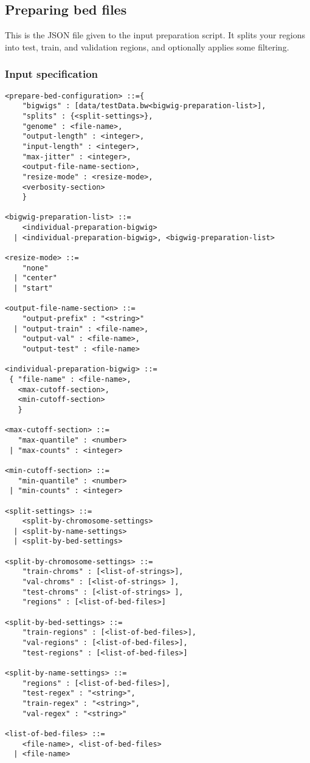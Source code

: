 \documentclass{article}
\begin{document}
\subsection{Preparing bed files}

This is the JSON file given to the input preparation script. It splits your regions into 
test, train, and validation regions, and optionally applies some filtering. 

\subsubsection{Input specification}

\begin{lstlisting}
<prepare-bed-configuration> ::={
    "bigwigs" : [data/testData.bw<bigwig-preparation-list>],
    "splits" : {<split-settings>},
    "genome" : <file-name>,
    "output-length" : <integer>,
    "input-length" : <integer>,
    "max-jitter" : <integer>,
    <output-file-name-section>,
    "resize-mode" : <resize-mode>,
    <verbosity-section>
    }

<bigwig-preparation-list> ::=
    <individual-preparation-bigwig> 
  | <individual-preparation-bigwig>, <bigwig-preparation-list>

<resize-mode> ::= 
    "none"
  | "center"
  | "start"

<output-file-name-section> ::=
    "output-prefix" : "<string>"
  | "output-train" : <file-name>,
    "output-val" : <file-name>,
    "output-test" : <file-name>

<individual-preparation-bigwig> ::=
 { "file-name" : <file-name>,
   <max-cutoff-section>,
   <min-cutoff-section> 
   }

<max-cutoff-section> ::=
   "max-quantile" : <number>
 | "max-counts" : <integer>

<min-cutoff-section> ::=
   "min-quantile" : <number>
 | "min-counts" : <integer>

<split-settings> ::=
    <split-by-chromosome-settings>
  | <split-by-name-settings>
  | <split-by-bed-settings>

<split-by-chromosome-settings> ::=
    "train-chroms" : [<list-of-strings>],
    "val-chroms" : [<list-of-strings> ],
    "test-chroms" : [<list-of-strings> ],
    "regions" : [<list-of-bed-files>]

<split-by-bed-settings> ::=
    "train-regions" : [<list-of-bed-files>],
    "val-regions" : [<list-of-bed-files>],
    "test-regions" : [<list-of-bed-files>]

<split-by-name-settings> ::=
    "regions" : [<list-of-bed-files>],
    "test-regex" : "<string>",
    "train-regex" : "<string>",
    "val-regex" : "<string>"

<list-of-bed-files> ::=
    <file-name>, <list-of-bed-files>
  | <file-name>

\end{lstlisting}
\end{document}
